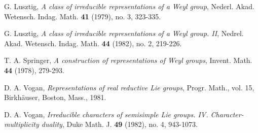 \documentclass[12pt, a4paper]{amsart}
\numberwithin{equation}{section}
\begin{document}
\begin{thebibliography}{99}
    G. Lusztig, \textit{A class of irreducible representations of a Weyl group}, Nederl. Akad. Wetensch. Indag. Math. \textbf{41} (1979), no. 3, 323-335.

    G. Lusztig, \textit{A class of irreducible representations of a Weyl group. II}, Nedrel. Akad. Wetensch. Indag. Math. \textbf{44} (1982), no. 2, 219-226.

    T. A. Springer, \textit{A construction of representations of Weyl groups}, Invent. Math. \textbf{44} (1978), 279-293.



   D. A. Vogan, \textit{Representations of real reductive Lie groups}, Progr. Math., vol. 15, Birkh\"{a}user, Boston, Mass., 1981.

   D. A. Vogan, \textit{Irreducible characters of semisimple Lie groups. IV. Character-multiplicity duality}, Duke Math. J. \textbf{49} (1982), no. 4, 943-1073.











\end{thebibliography}
\end{document}
